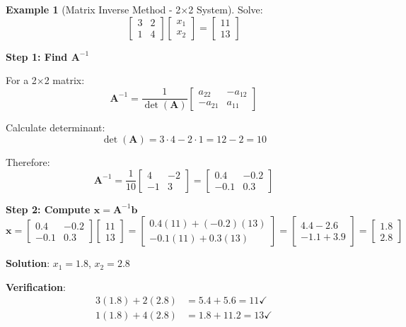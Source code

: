 \documentclass[12pt,a4paper]{article}
\theoremstyle{definition}
\newtheorem{example}{Example}[section]
\begin{document}
\begin{example}[Matrix Inverse Method - 2×2 System]
Solve:
\[
\begin{bmatrix}
3 & 2 \\
1 & 4
\end{bmatrix}
\begin{bmatrix}
x_1 \\ x_2
\end{bmatrix}
= \begin{bmatrix}
11 \\ 13
\end{bmatrix}
\]

\textbf{Step 1: Find $\mathbf{A}^{-1}$}

For a 2×2 matrix:
\[
\mathbf{A}^{-1} = \frac{1}{\det(\mathbf{A})} \begin{bmatrix}
a_{22} & -a_{12} \\
-a_{21} & a_{11}
\end{bmatrix}
\]

Calculate determinant:
\[
\det(\mathbf{A}) = 3 \cdot 4 - 2 \cdot 1 = 12 - 2 = 10
\]

Therefore:
\[
\mathbf{A}^{-1} = \frac{1}{10} \begin{bmatrix}
4 & -2 \\
-1 & 3
\end{bmatrix}
= \begin{bmatrix}
0.4 & -0.2 \\
-0.1 & 0.3
\end{bmatrix}
\]

\textbf{Step 2: Compute $\mathbf{x} = \mathbf{A}^{-1}\mathbf{b}$}
\[
\mathbf{x} = \begin{bmatrix}
0.4 & -0.2 \\
-0.1 & 0.3
\end{bmatrix}
\begin{bmatrix}
11 \\ 13
\end{bmatrix}
= \begin{bmatrix}
0.4(11) + (-0.2)(13) \\
-0.1(11) + 0.3(13)
\end{bmatrix}
= \begin{bmatrix}
4.4 - 2.6 \\
-1.1 + 3.9
\end{bmatrix}
= \begin{bmatrix}
1.8 \\ 2.8
\end{bmatrix}
\]

\textbf{Solution}: $x_1 = 1.8$, $x_2 = 2.8$

\textbf{Verification}:
\begin{align*}
3(1.8) + 2(2.8) &= 5.4 + 5.6 = 11 \checkmark \\
1(1.8) + 4(2.8) &= 1.8 + 11.2 = 13 \checkmark
\end{align*}
\end{example}
\end{document}
